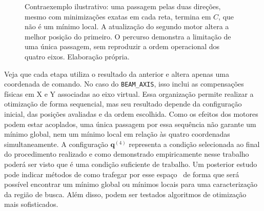 \documentclass[12pt,a4paper]{article}
\begin{document}
\begin{figure}[htbp]
    \centering
    \caption{Contraexemplo ilustrativo: uma passagem pelas duas direções, mesmo com minimizações exatas em cada reta, termina em $C$, que não é um mínimo local. A atualização do segundo motor altera a melhor posição do primeiro. O percurso demonstra a limitação de uma única passagem, sem reproduzir a ordem operacional dos quatro eixos. Elaboração própria.}
    \label{fig:passagem-direcoes-sem-minimo}
\end{figure}

Veja que cada etapa utiliza o resultado da anterior e altera apenas uma coordenada de comando. No caso do \texttt{BEAM\_AXIS}, isso inclui as compensações físicas em X e Y associadas ao eixo virtual. Essa organização permite realizar a otimização de forma sequencial, mas seu resultado depende da configuração inicial, das posições avaliadas e da ordem escolhida. Como os efeitos dos motores podem estar acoplados, uma única passagem por essa sequência não garante um mínimo global, nem um mínimo local em relação às quatro coordenadas simultaneamente. A configuração $\mathbf{q}^{(4)}$ representa a condição selecionada ao final do procedimento realizado e como demonstrado empiricamente nesse trabalho poderá ser visto que é uma condição suficiente de trabalho.
Um posterior estudo pode indicar métodos de como trafegar por esse espaço \Omega\ de forma que será possível encontrar um mínimo global ou mínimos locais para uma caracterização da região de busca. Além disso, podem ser testados algoritmos de otimização mais sofisticados.
\end{document}
